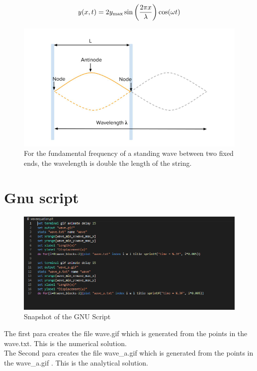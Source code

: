 \documentclass[oneside,hidelinks]{book}
\begin{document}
                $${\displaystyle y(x,t)=2y_{\text{max}}\sin \left({2\pi x \over \lambda }\right)\cos(\omega t)}$$
                \begin{figure}[hbtp]
                        \caption{For the fundamental frequency of a standing wave between two fixed ends, the wavelength is double the length of the string.}
                        \includegraphics[scale=0.9]{standing_wave.png}        
                \end{figure}
                
                


                \section{Gnu script}
                \begin{figure}[hbtp]
                        \caption{Snapshot of the GNU Script}
                        \hspace*{1cm}\includegraphics[scale=0.7]{wave_gnu.png}        
                \end{figure}
                The first para creates the file wave.gif which is generated from the points in the wave.txt. This is the numerical
                solution.\\
                The Second para  creates the file wave\_a.gif which is generated from the points in the wave\_a.gif . This is the analytical
                solution.
\end{document}
